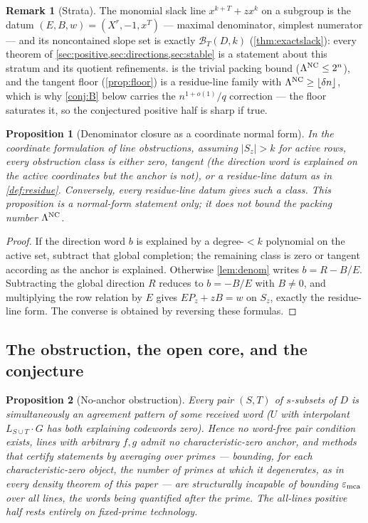 \documentclass[11pt]{article}
\newtheorem{proposition}[proposition]{Proposition}
\theoremstyle{definition}
\newtheorem{remark}[remark]{Remark}
\newcommand{\eps}{\varepsilon}
\newcommand{\emca}{\eps_{\rm mca}}
\begin{document}
\begin{remark}[Strata]\label{rem:strata}
The monomial slack line $x^{k+T}+zx^k$ on a subgroup is the datum $(E,B,w)=(X^r,-1,x^T)$ --- maximal denominator, simplest numerator --- and its noncontained slope set is exactly $\mathcal B_T(D,k)$ (\cref{thm:exactslack}): every theorem of \cref{sec:positive,sec:directions,sec:stable} is a statement about this stratum and its quotient refinements.   is the trivial packing bound ($\Lambda^{\rm NC}\le2^n$), and the tangent floor (\cref{prop:floor}) is a residue-line family with $\Lambda^{\rm NC}\ge\lfloor\delta n\rfloor$, which is why \cref{conj:B} below carries the $n^{1+o(1)}/q$ correction --- the floor saturates it, so the conjectured positive half is sharp if true.
\end{remark}

\begin{proposition}[Denominator closure as a coordinate normal form]\label{thm:closure}
In the coordinate formulation of line obstructions, assuming $|S_z|>k$ for active rows, every obstruction class is either zero, tangent (the direction word is explained on the active coordinates but the anchor is not), or a residue-line datum as in \cref{def:residue}.  Conversely, every residue-line datum gives such a class.  This proposition is a normal-form statement only; it does not bound the packing number $\Lambda^{\rm NC}$.
\end{proposition}

\begin{proof}
If the direction word $b$ is explained by a degree-$<k$ polynomial on the active set, subtract that global completion; the remaining class is zero or tangent according as the anchor is explained.  Otherwise \cref{lem:denom} writes $b=R-B/E$.  Subtracting the global direction $R$ reduces to $b=-B/E$ with $B\ne0$, and multiplying the row relation by $E$ gives $EP_z+zB=w$ on $S_z$, exactly the residue-line form.  The converse is obtained by reversing these formulas.
\end{proof}

\subsection{The obstruction, the open core, and the conjecture}

\begin{proposition}[No-anchor obstruction]\label{prop:noanchor}
Every pair $(S,T)$ of $s$-subsets of $D$ is simultaneously an agreement pattern of some received word ($U$ with interpolant $L_{S\cup T}\cdot G$ has both explaining codewords zero).  Hence no word-free pair condition exists, lines with arbitrary $f,g$ admit no characteristic-zero anchor, and methods that certify statements by averaging over primes --- bounding, for each characteristic-zero object, the number of primes at which it degenerates, as in every density theorem of this paper --- are structurally incapable of bounding $\emca$ over \emph{all} lines, the words being quantified after the prime.  The all-lines positive half rests entirely on fixed-prime technology.
\end{proposition}
\end{document}
